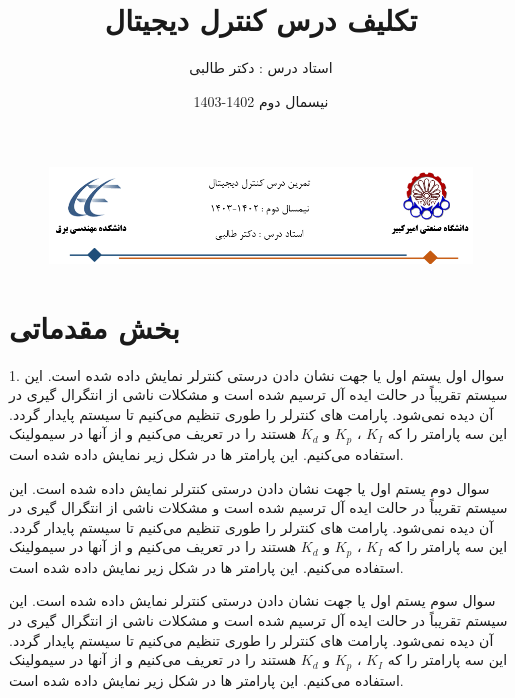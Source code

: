 \documentclass[12pt]{article}
\title{تکلیف درس کنترل دیجیتال}
\date{نیسمال دوم 1402-1403}
\author{استاد درس : دکتر طالبی}
\begin{document}
\markboth{\theauthor}{\thetitle}



\begin{figure}[htbp]
    \centering
    \includegraphics[width=\linewidth]{Header.png}
\end{figure}


\section{بخش مقدماتی}

    \begin{problem}{1. سوال اول}
  یستم اول یا  جهت نشان دادن درستی کنترلر  نمایش داده شده است. این سیستم تقریباً در حالت ایده آل ترسیم شده است و مشکلات ناشی از انتگرال گیری در آن دیده نمی‌شود. پارامت های کنترلر را طوری تنظیم می‌کنیم تا سیستم پایدار گردد. 
  این سه پارامتر را که $K_I$ ، $K_p$ و $K_d$ هستند را در  تعریف می‌کنیم و از آنها در سیمولینک استفاده می‌کنیم. این پارامتر ها در شکل زیر نمایش داده شده است.
    \end{problem}
    
    \begin{problem}{سوال دوم}
    	یستم اول یا  جهت نشان دادن درستی کنترلر  نمایش داده شده است. این سیستم تقریباً در حالت ایده آل ترسیم شده است و مشکلات ناشی از انتگرال گیری در آن دیده نمی‌شود. پارامت های کنترلر را طوری تنظیم می‌کنیم تا سیستم پایدار گردد. 
    	این سه پارامتر را که $K_I$ ، $K_p$ و $K_d$ هستند را در  تعریف می‌کنیم و از آنها در سیمولینک استفاده می‌کنیم. این پارامتر ها در شکل زیر نمایش داده شده است.
    \end{problem}
    
    \begin{problem}{سوال سوم}
    	یستم اول یا  جهت نشان دادن درستی کنترلر  نمایش داده شده است. این سیستم تقریباً در حالت ایده آل ترسیم شده است و مشکلات ناشی از انتگرال گیری در آن دیده نمی‌شود. پارامت های کنترلر را طوری تنظیم می‌کنیم تا سیستم پایدار گردد. 
    	این سه پارامتر را که $K_I$ ، $K_p$ و $K_d$ هستند را در  تعریف می‌کنیم و از آنها در سیمولینک استفاده می‌کنیم. این پارامتر ها در شکل زیر نمایش داده شده است.
    \end{problem}
    
\end{document}
